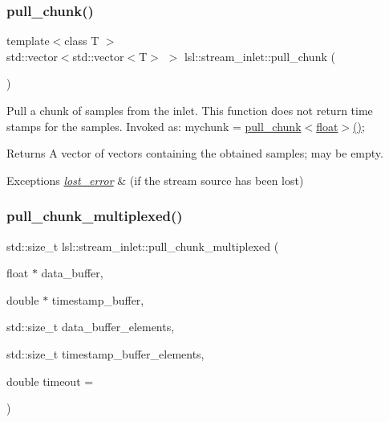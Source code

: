 \subsubsection{\texorpdfstring{pull\+\_\+chunk()}{pull\_chunk()}\hspace{0.1cm}{\footnotesize\ttfamily [3/3]}}
{\footnotesize\ttfamily template$<$class T $>$ \\
std\+::vector$<$std\+::vector$<$T$>$ $>$ lsl\+::stream\+\_\+inlet\+::pull\+\_\+chunk (\begin{DoxyParamCaption}{ }\end{DoxyParamCaption})\hspace{0.3cm}{\ttfamily [inline]}}

Pull a chunk of samples from the inlet. This function does not return time stamps for the samples. Invoked as\+: mychunk = \hyperlink{classlsl_1_1stream__inlet_a558f53812f5dc3c19b2cbe0026a61f6a}{pull\+\_\+chunk$<$float$>$()}; \begin{DoxyReturn}{Returns}
A vector of vectors containing the obtained samples; may be empty. 
\end{DoxyReturn}

\begin{DoxyExceptions}{Exceptions}
{\em \hyperlink{classlsl_1_1lost__error}{lost\+\_\+error}} & (if the stream source has been lost) \\
\hline
\end{DoxyExceptions}
\mbox{\label{classlsl_1_1stream__inlet_a97adf2cb7d60e4b47bf25217a2b17964}} 
\subsubsection{\texorpdfstring{pull\+\_\+chunk\+\_\+multiplexed()}{pull\_chunk\_multiplexed()}\hspace{0.1cm}{\footnotesize\ttfamily [1/8]}}
{\footnotesize\ttfamily std\+::size\+\_\+t lsl\+::stream\+\_\+inlet\+::pull\+\_\+chunk\+\_\+multiplexed (\begin{DoxyParamCaption}\item[{float $\ast$}]{data\+\_\+buffer,  }\item[{double $\ast$}]{timestamp\+\_\+buffer,  }\item[{std\+::size\+\_\+t}]{data\+\_\+buffer\+\_\+elements,  }\item[{std\+::size\+\_\+t}]{timestamp\+\_\+buffer\+\_\+elements,  }\item[{double}]{timeout = {} }\end{DoxyParamCaption})\hspace{0.3cm}{\ttfamily [inline]}}

